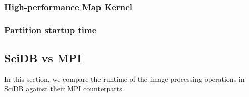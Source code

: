\documentclass[tog]{acmsiggraph}
\begin{document}
\subsubsection{High-performance Map Kernel}

\subsubsection{Partition startup time}

\subsection{SciDB vs MPI}\label{sec:clusterexp}
In this section, we compare the runtime of the image processing operations in
SciDB against their MPI counterparts.
\end{document}

